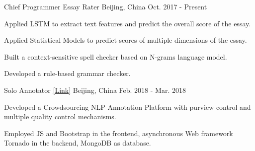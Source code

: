 

\begin{cventries}

  \cventry
    {Chief Programmer} %
    {Essay Rater} %
    {Beijing, China} %
    {Oct. 2017 - Present} %
    {
      \begin{cvitems} %
        \item {Applied LSTM to extract text features and predict the overall score of the essay.}
        \item {Applied Statistical Models to predict scores of multiple dimensions of the essay.}
        \item {Built a context-sensitive spell checker based on N-grams language model.}
        \item {Developed a rule-based grammar checker.}
      \end{cvitems}
    }

  \cventry
    {Solo} %
    {Annotator \href{http://mark.17zuoye.net/}{[\underline{Link}]}} %
    {Beijing, China} %
    {Feb. 2018 - Mar. 2018} %
    {
      \begin{cvitems} %
        \item {Developed a Crowdsourcing NLP Annotation Platform with purview control and multiple quality control mechanisms.}
        \item {Employed JS and Bootstrap in the frontend, asynchronous Web framework Tornado in the backend, MongoDB as database.}
      \end{cvitems}
    }



\end{cventries}
